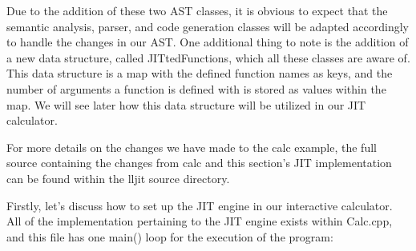 Due to the addition of these two AST classes, it is obvious to expect that the semantic analysis, parser, and code generation classes will be adapted accordingly to handle the changes in our AST. One additional thing to note is the addition of a new data structure, called JITtedFunctions, which all these classes are aware of. This data structure is a map with the defined function names as keys, and the number of arguments a function is defined with is stored as values within the map. We will see later how this data structure will be utilized in our JIT calculator.

For more details on the changes we have made to the calc example, the full source containing the changes from calc and this section’s JIT implementation can be found within the lljit source directory.


Firstly, let’s discuss how to set up the JIT engine in our interactive calculator. All of the implementation pertaining to the JIT engine exists within Calc.cpp, and this file has one main() loop for the execution of the program:

